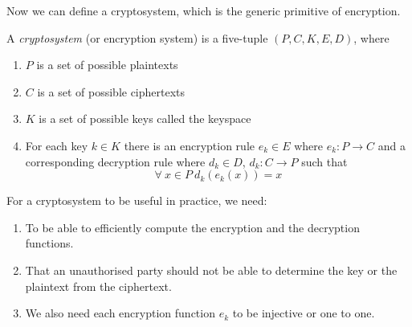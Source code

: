 \vspace{5mm}
Now we can define a cryptosystem, which is the generic primitive of encryption.
\begin{definition}
    A \textit{cryptosystem} (or encryption system) is a five-tuple $(P,C,K,E,D)$, where
    \begin{enumerate}
        \item $P$ is a set of possible plaintexts
        \item $C$ is a set of possible ciphertexts
        \item $K$ is a set of possible keys called the keyspace
        \item For each key $k \in K$
            there is an encryption rule $e_k \in E$ where $e_k : P \rightarrow C$
            and a corresponding decryption rule where $d_k \in D$, $d_k : C \rightarrow P$
            such that
            $$\forall\ x \in P\ d_k(e_k(x)) = x$$
    \end{enumerate}
\end{definition}

For a cryptosystem to be useful in practice, we need:
\begin{enumerate}
    \item To be able to efficiently compute the encryption and the decryption functions.
    \item That an unauthorised party should not be able to determine the key or the plaintext from the ciphertext.
    \item We also need each encryption function $e_k$ to be injective or one to one.
\end{enumerate}

